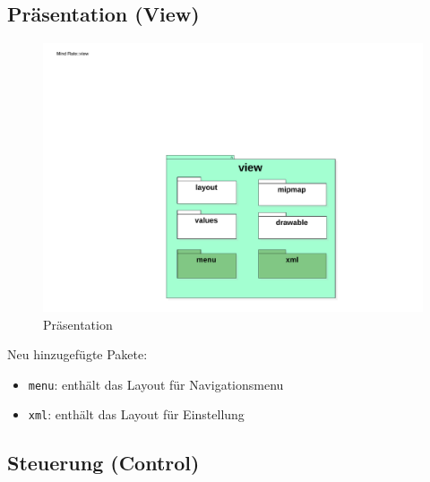 \documentclass[a4paper]{scrreprt}
\begin{document}
            \subsection{Präsentation (View)}                    
                
                \begin{figure}[H]
                        \centering
                        \includegraphics[scale = 1.0]{View.pdf}
                        \caption{Präsentation}
                \end{figure}

                Neu hinzugefügte Pakete:
                \begin{itemize}
                    \item \texttt{menu}: enthält das Layout für Navigationsmenu
                    \item \texttt{xml}: enthält das Layout für Einstellung
                \end{itemize}

            \subsection{Steuerung (Control)}
\end{document}

